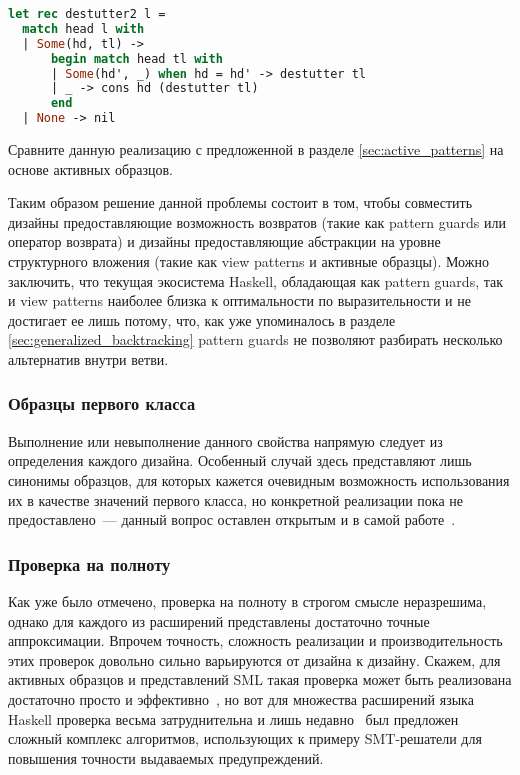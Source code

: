 \noindent
\begin{minipage}{\linewidth}
\begin{lstlisting}[language=ocaml, escapechar=@]
let rec destutter2 l = 
  match head l with
  | Some(hd, tl) ->
      begin match head tl with
      | Some(hd', _) when hd = hd' -> destutter tl
      | _ -> cons hd (destutter tl)
      end
  | None -> nil
\end{lstlisting}
\end{minipage}

Сравните данную реализацию с предложенной в разделе \ref{sec:active_patterns} на основе активных образцов.

Таким образом решение данной проблемы состоит в том, чтобы совместить дизайны предоставляющие возможность возвратов (такие как pattern guards или оператор возврата) и дизайны предоставляющие абстракции на уровне структурного вложения (такие как view patterns и активные образцы). Можно заключить, что текущая экосистема Haskell, обладающая как pattern guards, так и view patterns наиболее близка к оптимальности по выразительности и не достигает ее лишь потому, что, как уже упоминалось в разделе \ref{sec:generalized_backtracking} pattern guards не позволяют разбирать несколько альтернатив внутри ветви.

\subsubsection{Образцы первого класса}

Выполнение или невыполнение данного свойства напрямую следует из определения каждого дизайна. Особенный случай здесь представляют лишь синонимы образцов, для которых кажется очевидным возможность использования их в качестве значений первого класса, но конкретной реализации пока не предоставлено~--- данный вопрос оставлен открытым и в самой работе~\cite{pickering2016pattern}.

\subsubsection{Проверка на полноту}

Как уже было отмечено, проверка на полноту в строгом смысле неразрешима, однако для каждого из расширений представлены достаточно точные аппроксимации. Впрочем точность, сложность реализации и производительность этих проверок довольно сильно варьируются от дизайна к дизайну. Скажем, для активных образцов и представлений SML такая проверка может быть реализована достаточно просто и эффективно~\cite{maranget2007warnings}, но вот для множества расширений языка Haskell проверка весьма затруднительна и лишь недавно~\cite{peytonjones2020lower} был предложен сложный комплекс алгоритмов, использующих к примеру SMT-решатели для повышения точности выдаваемых предупреждений.  

